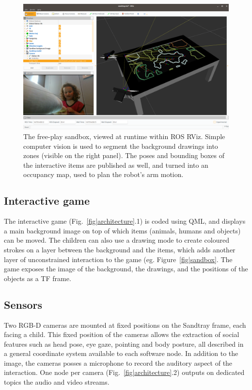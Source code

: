 \documentclass[sigconf]{acmart}
\begin{document}
\begin{figure}
    \centering
    \includegraphics[width=\linewidth]{rviz-sandtray}
    \caption{The free-play sandbox, viewed at runtime within ROS RViz. Simple
    computer vision is used to segment the background drawings into zones
    (visible on the right panel). The poses and bounding boxes of the
    interactive items are published as well, and turned into an occupancy map,
    used to plan the robot's arm motion.} 

    \label{fig|rviz}
\end{figure}

\subsection{Interactive game} The interactive game
(Fig.~\ref{fig|architecture}.1) is coded using QML, and displays a main
background image on top of which items (animals, humans and objects) can be
moved.  The children can also use a drawing mode to create coloured strokes on a
layer between the background and the items, which adds another layer of
unconstrained interaction to the game (eg. Figure~\ref{fig|sandbox}. The game
exposes the image of the background, the drawings, and the positions of the
objects as a TF frame.

\subsection{Sensors} Two RGB-D cameras are mounted at fixed positions on the
Sandtray frame, each facing a child. This fixed position of the cameras allows
the extraction of social features such as head pose, eye gaze, pointing and body
posture, all described in a general coordinate system available to each software
node. In addition to the image, the cameras posses a microphone to record the
auditory aspect of the interaction. One node per camera
(Fig.~\ref{fig|architecture}.2) outputs on dedicated topics the audio and video
streams.
\end{document}
